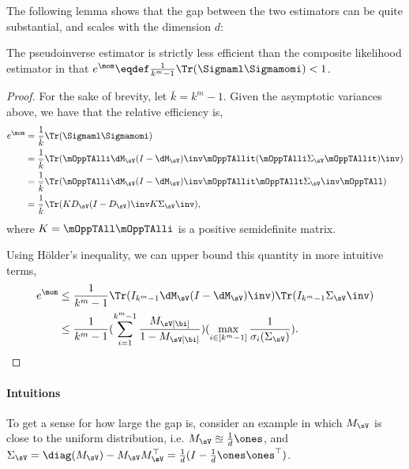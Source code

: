 The following lemma shows that the gap between the two estimators can be quite substantial,
and scales with the dimension $d$: %
\begin{corollary}
The pseudoinverse estimator is strictly less efficient
than the composite likelihood estimator in that $e^\mom \eqdef \frac{1}{k^m-1} \Tr(\Sigmaml\Sigmamomi ) < 1$.
\end{corollary}
\begin{proof}
  For the sake of brevity, let $\bar k = k^m - 1$.
  Given the asymptotic variances above, we have that the relative efficiency is,
  \begin{align*}
    e^\mom
    &= \frac{1}{\bar k} \Tr(\Sigmaml \Sigmamomi) \\
    &= \frac{1}{\bar k} \Tr( \mOppTAlli \dM_\sV (I - \dM_\sV)\inv \mOppTAllit (\mOppTAlli \Sigma_\sV \mOppTAllit)\inv )  \\
    &= \frac{1}{\bar k} \Tr( \mOppTAlli \dM_\sV (I - \dM_\sV)\inv \mOppTAllit \mOppTAllt \Sigma_\sV\inv \mOppTAll ) \\ 
    &= \frac{1}{\bar k} \Tr( K  D_\sV (I - D_\sV)\inv  K \Sigma_\sV\inv ),
  \end{align*}
  where $K = \mOppTAll \mOppTAlli$ is a positive semidefinite matrix.

  Using H\"{o}lder's inequality, we can upper bound this quantity in more intuitive terms,
  \begin{align*}
    e^\mom
    &\le \frac{1}{k^m-1} \Tr(I_{k^m-1} \dM_\sV (I - \dM_\sV)\inv ) \Tr(I_{k^m-1} \Sigma_\sV\inv) \\ 
    &\le \frac{1}{k^m-1}(\sum_{i=1}^{k^m-1} \frac{ M_\sV[\bi] }{ 1 - M_\sV[\bi]}) 
      (\max_{i \in [k^m-1]}  \frac{1}{\sigma_{i}(\Sigma_\sV)}).
  \end{align*}

\end{proof}

\paragraph{Intuitions}
To get a sense for how large the gap is, consider an example in which
$M_\sV$ is close to the uniform distribution, i.e. $M_\sV
\approxeq \frac{1}{d} \ones$, and $\Sigma_\sV = \diag(M_\sV) - M_\sV
M_\sV^\top = \frac{1}{d}(I - \frac{1}{d} \ones \ones^\top)$.

